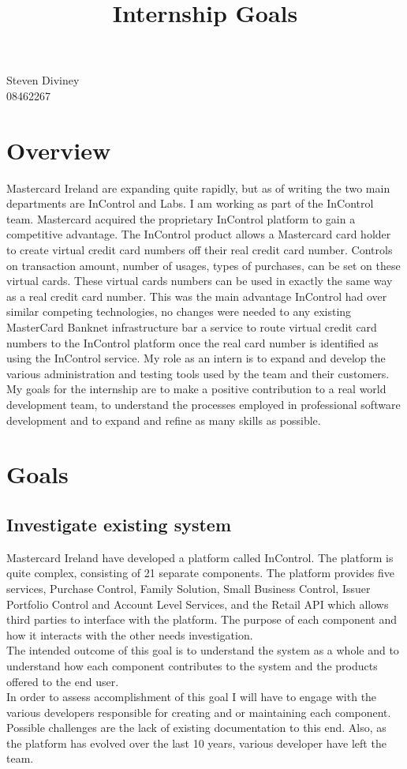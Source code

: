 \documentclass[a4paper,12pt, titlepage]{article}
\title{Internship Goals}
\begin{document}
\maketitle						%
\begin{center}
  {\large Steven Diviney} \\
  08462267 \\
\end{center}
\section{Overview}
Mastercard Ireland are expanding quite rapidly, but as of writing the two main departments are InControl and Labs. I am working as part of the InControl team. Mastercard acquired the proprietary InControl platform to gain a competitive advantage. The InControl product allows a Mastercard card holder to create virtual credit card numbers off their real credit card number. Controls on transaction amount, number of usages, types of purchases, can be set on these virtual cards. These virtual cards numbers can be used in exactly the same way as a real credit card number. This was the main advantage InControl had over similar competing technologies, no changes were needed to any existing  MasterCard Banknet infrastructure bar a service to route virtual credit card numbers to the InControl platform once the real card number is identified as using the InControl service. My role as an intern is to expand and develop the various administration and testing tools used by the team and their customers. My goals for the internship are to make a positive contribution to a real world development team, to understand the processes employed in professional software development and to expand and refine as many skills as possible. 
\section{Goals}
\subsection{Investigate existing system}
Mastercard Ireland have developed a platform called InControl. The platform is quite complex, consisting of 21 separate components. The platform provides five services, Purchase Control, Family Solution, Small Business Control, Issuer Portfolio Control and Account Level Services, and the Retail API which allows third parties to interface with the platform. The purpose of each component and how it interacts with the other needs investigation. 
\\The intended outcome of this goal is to understand the system as a whole and to understand how each component contributes to the system and the products offered to the end user. 
\\In order to assess accomplishment of this goal I will have to engage with the various developers responsible for creating and or maintaining each component. 
\\Possible challenges are the lack of existing documentation to this end. Also, as the platform has evolved over the last 10 years, various developer have left the team.
\end{document}
